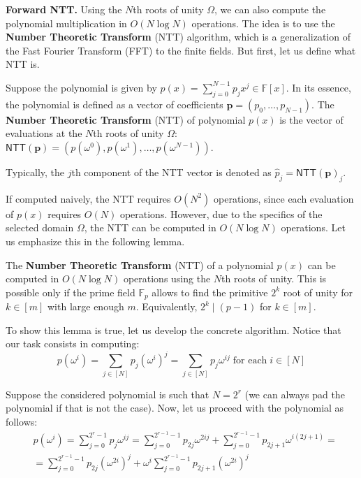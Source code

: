 \documentclass[../lecture-notes-148x210.tex]{subfiles}
\begin{document}
\textcolor{blue!60!black}{\textbf{Forward NTT.}} Using the $N$th roots of unity $\Omega$, we can also compute the polynomial
multiplication in $O(N \log N)$ operations. The idea is to use the \textbf{Number
Theoretic Transform} (NTT) algorithm, which is a generalization of the Fast
Fourier Transform (FFT) to the finite fields. But first, let us define 
what NTT is.

\begin{definition}[NTT]
    Suppose the polynomial is given by $p(x) = \sum_{j=0}^{N-1}p_jx^j \in \mathbb{F}[x]$. In its
    essence, the polynomial is defined as a vector of coefficients
    $\boldsymbol{p}=(p_0,\dots,p_{N-1})$. The \textbf{Number Theoretic
    Transform} (NTT) of polynomial $p(x)$ is the vector of evaluations at 
    the $N$th roots of unity $\Omega$:
    $\mathsf{NTT}(\boldsymbol{p}) =
    (p(\omega^0),p(\omega^1),\dots,p(\omega^{N-1}))$.
\end{definition}

\begin{remark}
    Typically, the $j$th component of the NTT vector is denoted as $\hat{p}_j = \mathsf{NTT}(\boldsymbol{p})_j$.
\end{remark}

If computed naively, the NTT requires $O(N^2)$ operations, since each 
evaluation of $p(x)$ requires $O(N)$ operations. However, due to the 
specifics of the selected domain $\Omega$, the NTT can be computed in
$O(N \log N)$ operations. Let us emphasize this in the following lemma.

\begin{lemma}
    The \textbf{Number Theoretic Transform} (NTT) of a polynomial $p(x)$ can be
    computed in $O(N \log N)$ operations using the $N$th roots of unity. This is
    possible only if the prime field $\mathbb{F}_p$ allows to find the primitive
    $2^k$ root of unity for $k \in [m]$ with large enough $m$. Equivalently, 
    $2^k \mid (p-1)$ for $k \in [m]$.
\end{lemma}

To show this lemma is true, let us develop the concrete algorithm. Notice that 
our task consists in computing:
\begin{equation*}
    p(\omega^i) = \sum_{j \in [N]} p_j (\omega^i)^j = \sum_{j \in [N]} p_j \omega^{ij} \; \text{for each} \; i \in [N]
\end{equation*}

Suppose the considered polynomial is such that $N=2^r$ (we can always pad the
polynomial if that is not the case). Now, let us proceed with the polynomial as
follows:
\begin{equation*}
    \begin{aligned}
        &p(\omega^i) = \sum_{j=0}^{2^{r}-1}p_j\omega^{ij} = \sum_{j=0}^{2^{r-1}-1}p_{2j}\omega^{2ij} + \sum_{j=0}^{2^{r-1}-1}p_{2j+1}\omega^{i(2j+1)} = \\
        &= \sum_{j=0}^{2^{r-1}-1}p_{2j}(\omega^{2i})^j + \omega^i\sum_{j=0}^{2^{r-1}-1}p_{2j+1} (\omega^{2i})^j
    \end{aligned}
\end{equation*}
\end{document}
